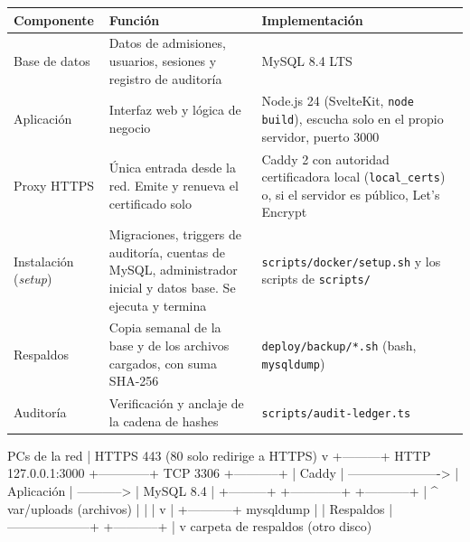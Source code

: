 \begin{xltabular}{\linewidth}{@{}l L L@{}}
	\toprule
	\textbf{Componente} & \textbf{Función} & \textbf{Implementación} \\
	\midrule
	\endhead
	Base de datos & Datos de admisiones, usuarios, sesiones y registro de auditoría &
	MySQL 8.4 LTS \\
	Aplicación & Interfaz web y lógica de negocio & Node.js 24 (SvelteKit, \texttt{node build}),
	escucha solo en el propio servidor, puerto 3000 \\
	Proxy HTTPS & Única entrada desde la red. Emite y renueva el certificado solo &
	Caddy 2 con autoridad certificadora local (\texttt{local\_certs}) o, si el servidor es
	público, Let's Encrypt \\
	Instalación (\emph{setup}) & Migraciones, triggers de auditoría, cuentas de MySQL,
	administrador inicial y datos base. Se ejecuta y termina &
	\texttt{scripts/docker/setup.sh} y los scripts de \texttt{scripts/} \\
	Respaldos & Copia semanal de la base y de los archivos cargados, con suma SHA-256 &
	\texttt{deploy/backup/*.sh} (bash, \texttt{mysqldump}) \\
	Auditoría & Verificación y anclaje de la cadena de hashes &
	\texttt{scripts/audit-ledger.ts} \\
	\bottomrule
\end{xltabular}

\begin{codigo}[label={Flujo de red (igual en ambos modos)}]
  PCs de la red
       |  HTTPS 443  (80 solo redirige a HTTPS)
       v
  +---------+   HTTP 127.0.0.1:3000   +------------+   TCP 3306   +-----------+
  |  Caddy  | ----------------------> | Aplicación | -----------> | MySQL 8.4 |
  +---------+                         +------------+              +-----------+
                                            |                          ^
                                     var/uploads (archivos)            |
                                            |                          |
                                            v                          |
                                     +-----------+  mysqldump          |
                                     | Respaldos | --------------------+
                                     +-----------+
                                            |
                                            v
                                  carpeta de respaldos (otro disco)
\end{codigo}

